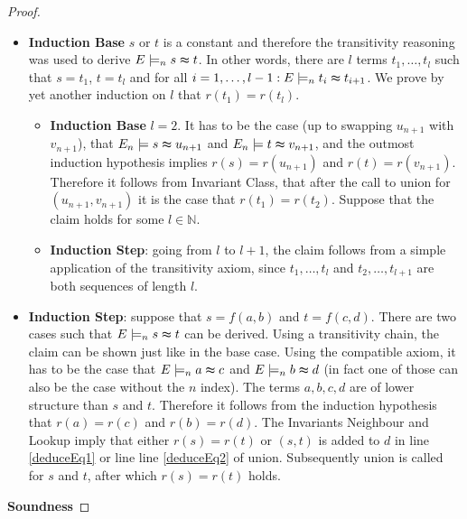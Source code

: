 \begin{proof}
\begin{itemize}
\begin{itemize}
\item \textbf{Induction Base} $s$ or $t$ is a constant and therefore the transitivity reasoning was used to derive $E \models_n s \thickapprox t$.
In other words, there are $l$ terms $t_1,\ldots,t_l$ such that $s = t_1$, $t = t_l$ and for all $i = 1,\ldots,l-1: E \models_n t_i \thickapprox t_{i+1}$.
We prove by yet another induction on $l$ that $r(t_1) = r(t_l)$.
\begin{itemize}
\item \textbf{Induction Base} $l = 2$. It has to be the case (up to swapping $u_{n+1}$ with $v_{n+1}$), that $E_n \models s \thickapprox u_{n+1}$ and $E_n \models t \thickapprox v_{n+1}$, and the outmost induction hypothesis implies $r(s) = r(u_{n+1})$ and $r(t) = r(v_{n+1})$.
Therefore it follows from Invariant Class, that after the call to union for $(u_{n+1},v_{n+1})$ it is the case that $r(t_1) = r(t_2)$.
Suppose that the claim holds for some $l \in \mathbb{N}$.
\item \textbf{Induction Step}: going from $l$ to $l+1$, the claim follows from a simple application of the transitivity axiom, since $t_1,\ldots,t_l$ and $t_2,\ldots,t_{l+1}$ are both sequences of length $l$.
\end{itemize}
\item \textbf{Induction Step}: suppose that $s = f(a,b)$ and $t = f(c,d)$.
There are two cases such that $E \models_n s \thickapprox t$ can be derived.
Using a transitivity chain, the claim can be shown just like in the base case.
Using the compatible axiom, it has to be the case that $E \models_n a \thickapprox c$ and $E \models_n b \thickapprox d$ (in fact one of those can also be the case without the $n$ index).
The terms $a,b,c,d$ are of lower structure than $s$ and $t$.
Therefore it follows from the induction hypothesis that $r(a) = r(c)$ and $r(b) = r(d)$.
The Invariants Neighbour and Lookup imply that either $r(s) = r(t)$ or $(s,t)$ is added to $d$ in line \ref{deduceEq1} or line line \ref{deduceEq2} of union.
Subsequently union is called for $s$ and $t$, after which $r(s) = r(t)$ holds.
\end{itemize}
\end{itemize}

\textbf{Soundness}


\end{proof}
